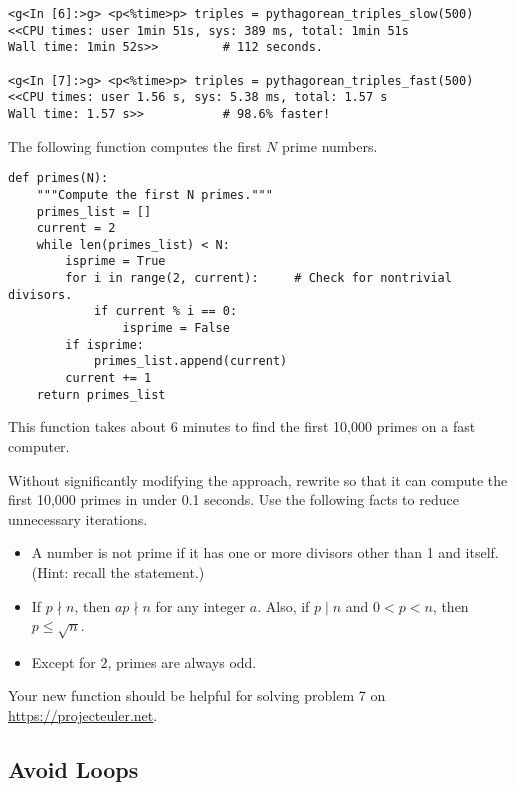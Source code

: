 \begin{lstlisting}
<g<In [6]:>g> <p<%time>p> triples = pythagorean_triples_slow(500)
<<CPU times: user 1min 51s, sys: 389 ms, total: 1min 51s
Wall time: 1min 52s>>         # 112 seconds.

<g<In [7]:>g> <p<%time>p> triples = pythagorean_triples_fast(500)
<<CPU times: user 1.56 s, sys: 5.38 ms, total: 1.57 s
Wall time: 1.57 s>>           # 98.6% faster!
\end{lstlisting}

\begin{problem}
The following function computes the first $N$ prime numbers.
\begin{lstlisting}
def primes(N):
    """Compute the first N primes."""
    primes_list = []
    current = 2
    while len(primes_list) < N:
        isprime = True
        for i in range(2, current):     # Check for nontrivial divisors.
            if current % i == 0:
                isprime = False
        if isprime:
            primes_list.append(current)
        current += 1
    return primes_list
\end{lstlisting}
This function takes about 6 minutes to find the first 10,000 primes on a fast computer.

Without significantly modifying the approach, rewrite  so that it can compute the first 10,000 primes in under 0.1 seconds.
Use the following facts to reduce unnecessary iterations.
\begin{itemize}
\item A number is not prime if it has one or more divisors other than 1 and itself.
\\(Hint: recall the  statement.)
\item If $p\nmid n$, then $ap\nmid n$ for any integer $a$.
Also, if $p \mid n$ and $0 < p < n$, then $p \le \sqrt{n}$.
\item Except for $2$, primes are always odd.
\end{itemize}
Your new function should be helpful for solving problem 7 on \url{https://projecteuler.net}.
\label{prob:profiling-primes-naive}
\end{problem}

\subsection*{Avoid Loops} %



